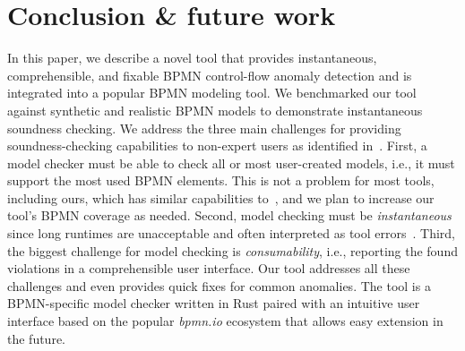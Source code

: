 \documentclass[
twocolumn,
]{ceurart}
\begin{document}
\section{Conclusion \& future work}

In this paper, we describe a novel tool that provides instantaneous, comprehensible, and fixable BPMN control-flow anomaly detection and is integrated into a popular BPMN modeling tool.
We benchmarked our tool against synthetic and realistic BPMN models to demonstrate instantaneous soundness checking.
We address the three main challenges for providing soundness-checking capabilities to non-expert users as identified in~\cite{fahlandAnalysisDemandInstantaneous2011}.
First, a model checker must be able to check all or most user-created models, i.e., it must support the most used BPMN elements.
This is not a problem for most tools, including ours, which has similar capabilities to~\cite{corradiniFormalApproachAnalysis2021}, and we plan to increase our tool's BPMN coverage as needed.
Second, model checking must be \textit{instantaneous} since long runtimes are unacceptable and often interpreted as tool errors~\cite{fahlandAnalysisDemandInstantaneous2011}.
Third, the biggest challenge for model checking is \textit{consumability}, i.e., reporting the found violations in a comprehensible user interface.
Our tool addresses all these challenges and even provides quick fixes for common anomalies.
The tool is a BPMN-specific model checker written in Rust paired with an intuitive user interface based on the popular \textit{bpmn.io} ecosystem that allows easy extension in the future.



\end{document}
